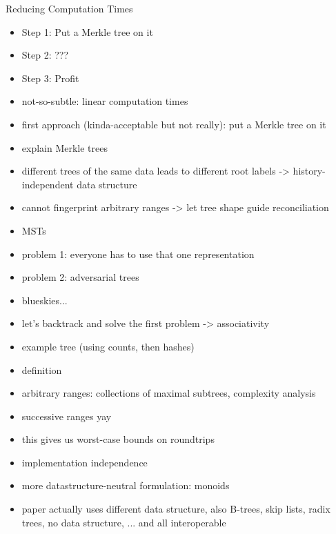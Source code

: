 \documentclass{beamer}
\begin{document}
\begin{frame}{Reducing Computation Times}
    \begin{itemize}
        \item Step 1: Put a Merkle tree on it
        \item Step 2: ???
        \item Step 3: Profit
    \end{itemize}
\end{frame}

\begin{frame}{}
    
\end{frame}



\begin{itemize}
    \item not-so-subtle: linear computation times
    \item first approach (kinda-acceptable but not really): put a Merkle tree on it
    \item explain Merkle trees
    \item different trees of the same data leads to different root labels -> history-independent data structure
    \item cannot fingerprint arbitrary ranges -> let tree shape guide reconciliation
    \item MSTs
    \item problem 1: everyone has to use that one representation
    \item problem 2: adversarial trees
    \item blueskies...
\end{itemize}

\begin{itemize}
    \item let's backtrack and solve the first problem -> associativity
    \item example tree (using counts, then hashes)
    \item definition
    \item arbitrary ranges: collections of maximal subtrees, complexity analysis
    \item successive ranges yay
\end{itemize}

\begin{itemize}
    \item this gives us worst-case bounds on roundtrips
    \item implementation independence
    \item more datastructure-neutral formulation: monoids
    \item paper actually uses different data structure, also B-trees, skip lists, radix trees, no data structure, ... and all interoperable
\end{itemize}
\end{document}
